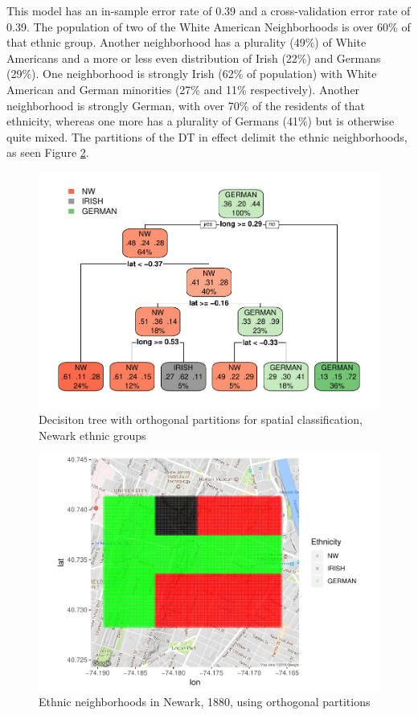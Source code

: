 \documentclass[]{elsarticle} %
\makeatletter
\def\maxwidth{\ifdim\Gin@nat@width>\linewidth\linewidth
\else\Gin@nat@width\fi}
\let\Oldincludegraphics\includegraphics
\renewcommand{\includegraphics}[1]{\Oldincludegraphics[width=\maxwidth]{#1}}
\makeatother
\begin{document}
This model has an in-sample error rate of 0.39 and a cross-validation
error rate of 0.39. The population of two of the White American
Neighborhoods is over 60\% of that ethnic group. Another neighborhood
has a plurality (49\%) of White Americans and a more or less even
distribution of Irish (22\%) and Germans (29\%). One neighborhood is
strongly Irish (62\% of population) with White American and German
minorities (27\% and 11\% respectively). Another neighborhood is
strongly German, with over 70\% of the residents of that ethnicity,
whereas one more has a plurality of Germans (41\%) but is otherwise
quite mixed. The partitions of the DT in effect delimit the ethnic
neighborhoods, as seen Figure \ref{fig:fig13-map-orthogonal-newark}.

\begin{figure}
\centering
\includegraphics{Trees_with_Base_Functions_v2_files/figure-latex/fig12-tree-orthogonal-newark-1.pdf}
\caption{\label{fig:fig12-tree-orthogonal-newark}Decisiton tree with
orthogonal partitions for spatial classification, Newark ethnic groups}
\end{figure}

\begin{figure}
\centering
\includegraphics{Trees_with_Base_Functions_v2_files/figure-latex/fig13-map-orthogonal-newark-1.pdf}
\caption{\label{fig:fig13-map-orthogonal-newark}Ethnic neighborhoods in
Newark, 1880, using orthogonal partitions}
\end{figure}
\end{document}
